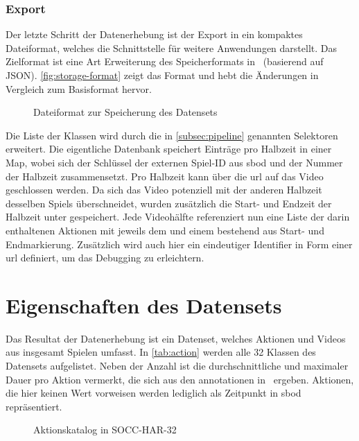 \subsubsection{Export}

Der letzte Schritt der Datenerhebung ist der Export in ein kompaktes Dateiformat, welches die Schnittstelle für weitere Anwendungen darstellt.
Das Zielformat ist eine Art Erweiterung des Speicherformats in~\cite{Caba15} (basierend auf JSON).
\autoref{fig:storage-format} zeigt das Format und hebt die Änderungen in Vergleich zum Basisformat hervor.

\begin{figure}
    \centering
    \caption{Dateiformat zur Speicherung des Datensets}
    \label{fig:storage-format}
\end{figure}

Die Liste der Klassen wird durch die in \autoref{subsec:pipeline} genannten Selektoren erweitert.
Die eigentliche Datenbank speichert Einträge pro Halbzeit in einer Map, wobei sich der Schlüssel der externen Spiel-ID aus \gls{sbod} und der Nummer der Halbzeit zusammensetzt.
Pro Halbzeit kann über die \gls{url} auf das Video geschlossen werden.
Da sich das Video potenziell mit der anderen Halbzeit desselben Spiels überschneidet, wurden zusätzlich die Start- und Endzeit der Halbzeit unter  gespeichert.
Jede Videohälfte referenziert nun eine Liste der darin enthaltenen Aktionen mit jeweils dem  und einem  bestehend aus Start- und Endmarkierung.
Zusätzlich wird auch hier ein eindeutiger Identifier in Form einer \gls{url} definiert, um das Debugging zu erleichtern.

\section{Eigenschaften des Datensets}
\label{sec:eigenschaften-des-datensets}

Das Resultat der Datenerhebung ist ein Datenset, welches \noaction Aktionen und \novideos Videos aus insgesamt \nomatches Spielen umfasst.
In \autoref{tab:action} werden alle 32 Klassen des Datensets aufgelistet.
Neben der Anzahl ist die durchschnittliche und maximaler Dauer pro Aktion vermerkt, die sich aus den \gls{annotationen} in~\cite{Statsbomb20} ergeben.
Aktionen, die hier keinen Wert vorweisen werden lediglich als Zeitpunkt in \gls{sbod} repräsentiert.

\begin{figure}
    \centering
    \small
    \begin{subfigure}{0.45\textwidth}
        \centering
    \end{subfigure}
    \begin{subfigure}{0.45\textwidth}
        \centering
    \end{subfigure}
    \caption{Aktionskatalog in SOCC-HAR-32}
    \label{tab:action}
\end{figure}

